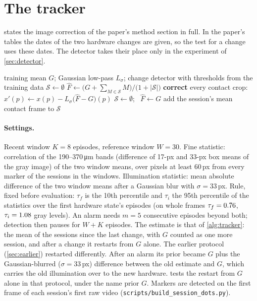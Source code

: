 \documentclass[10pt,twocolumn,letterpaper]{article}
\begin{document}
\section{The tracker}
\label{sec:tracker}
 states the image correction of the paper's method section in full. In the paper's tables the dates of the two hardware changes are given, so the test for a change uses these dates. The detector takes their place only in the experiment of \cref{sec:detector}.
\begin{algorithm}[h]
\caption{Correcting the robot's stream for its hardware state}
\label{alg:tracker}
\small\begin{algorithmic}[1]
\Require training mean $G$; Gaussian low-pass $L_\sigma$; change detector with thresholds from the training data
\State $\mathcal S \gets \emptyset$ 
  \State $\hat F \gets \big(G + \sum_{M\in\mathcal S} M\big) / \big(1 + |\mathcal S|\big)$
    \State \textbf{correct} every contact crop: $x'(p) \gets x(p) - L_\sigma\big(\hat F - G\big)(p)$ 
      \State $\mathcal S \gets \emptyset$; \ $\hat F \gets G$
    \EndIf
  \EndFor
  \State add the session's mean contact frame to $\mathcal S$
\EndFor
\end{algorithmic}
\end{algorithm}
\paragraph{Settings.} Recent window $K=8$ episodes, reference window $W=30$. Fine statistic: correlation of the 190--370\,\si{\micro\metre} bands (difference of 17-px and 33-px box means of the gray image) of the two window means, over pixels at least 60\,px from every marker of the sessions in the windows. Illumination statistic: mean absolute difference of the two window means after a Gaussian blur with $\sigma=33$\,px. Rule, fixed before evaluation: $\tau_f$ is the 10th percentile and $\tau_i$ the 95th percentile of the statistics over the first hardware state's episodes (on whole frames $\tau_f=0.76$, $\tau_i=1.08$ gray levels). An alarm needs $m=5$ consecutive episodes beyond both; detection then pauses for $W+K$ episodes. The estimate is that of \cref{alg:tracker}: the mean of the sessions since the last change, with $G$ counted as one more session, and after a change it restarts from $G$ alone. The earlier protocol (\cref{sec:earlier}) restarted differently. After an alarm its prior became $G$ plus the Gaussian-blurred ($\sigma=33$\,px) difference between the old estimate and $G$, which carries the old illumination over to the new hardware.  tests the restart from $G$ alone in that protocol, under the name prior $G$. Markers are detected on the first frame of each session's first raw video (\texttt{scripts/build\_session\_dots.py}).
\end{document}
